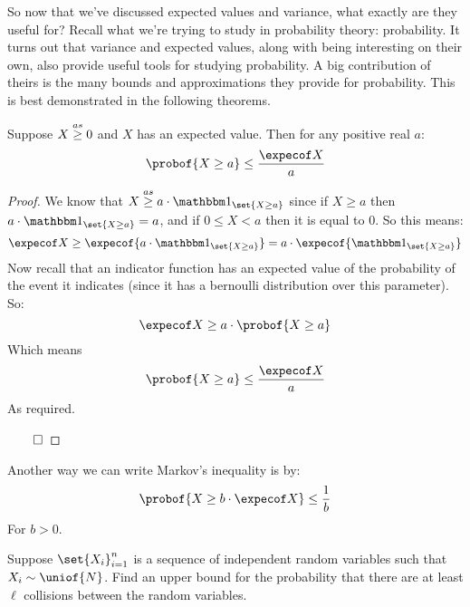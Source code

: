 So now that we've discussed expected values and variance, what exactly are they useful for?
Recall what we're trying to study in probability theory: probability.
It turns out that variance and expected values, along with being interesting on their own, also provide
useful tools for studying probability.
A big contribution of theirs is the many bounds and approximations they provide for probability.
This is best demonstrated in the following theorems.

\begin{thrm*}

	Suppose $X\mathrel{\overset{as}\geq}0$ and $X$ has an expected value. Then for any positive real $a$:
	\[ \probof{X\geq a} \leq \frac{\expecof X}a \]

\end{thrm*}

\begin{proof}

	We know that $X\asgeq a\cdot\bone_{\set{X\geq a}}$ since if $X\geq a$ then
	$a\cdot\bone_{\set{X\geq a}}=a$, and if $0\leq X<a$ then it is equal to $0$.
	So this means:
	\[ \expecof X\geq \expecof{a\cdot\bone_{\set{X\geq a}}} = a\cdot\expecof{\bone_{\set{X\geq a}}} \]
	Now recall that an indicator function has an expected value of the probability of the event it indicates
	(since it has a bernoulli distribution over this parameter).
	So:
	\[ \expecof X\geq a\cdot\probof{X\geq a} \]
	Which means
	\[ \probof{X\geq a} \leq \frac{\expecof X}a \]
	As required.

	\hfill$\qed$

\end{proof}

Another way we can write Markov's inequality is by:
\[ \probof{X\geq b\cdot\expecof X} \leq \frac1b \]
For $b>0$.

\begin{exercise}

	Suppose $\set{X_i}_{i=1}^n$ is a sequence of independent random variables such that $X_i\sim\uniof{N}$.
	Find an upper bound for the probability that there are at least $\ell$ collisions between the random
	variables.

\end{exercise}

